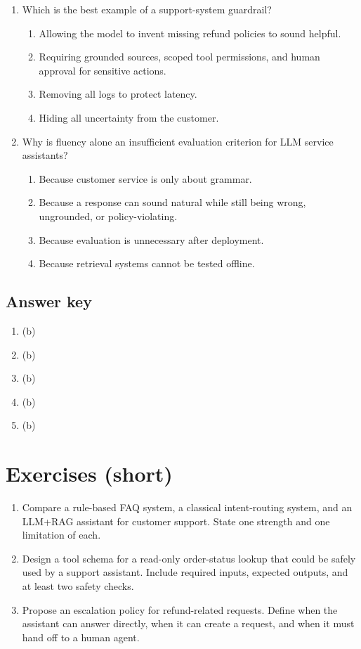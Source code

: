 \begin{enumerate}
  \item Which is the best example of a support-system guardrail?
  \begin{enumerate}
    \item Allowing the model to invent missing refund policies to sound helpful.
    \item Requiring grounded sources, scoped tool permissions, and human approval for sensitive actions.
    \item Removing all logs to protect latency.
    \item Hiding all uncertainty from the customer.
  \end{enumerate}

  \item Why is fluency alone an insufficient evaluation criterion for LLM service assistants?
  \begin{enumerate}
    \item Because customer service is only about grammar.
    \item Because a response can sound natural while still being wrong, ungrounded, or policy-violating.
    \item Because evaluation is unnecessary after deployment.
    \item Because retrieval systems cannot be tested offline.
  \end{enumerate}
\end{enumerate}

\subsection*{Answer key}
\begin{enumerate}
  \item (b)
  \item (b)
  \item (b)
  \item (b)
  \item (b)
\end{enumerate}

\section{Exercises (short)}
\begin{enumerate}
  \item Compare a rule-based FAQ system, a classical intent-routing system, and an LLM+RAG assistant for customer support. State one strength and one limitation of each.
  \item Design a tool schema for a read-only order-status lookup that could be safely used by a support assistant. Include required inputs, expected outputs, and at least two safety checks.
  \item Propose an escalation policy for refund-related requests. Define when the assistant can answer directly, when it can create a request, and when it must hand off to a human agent.
\end{enumerate}

